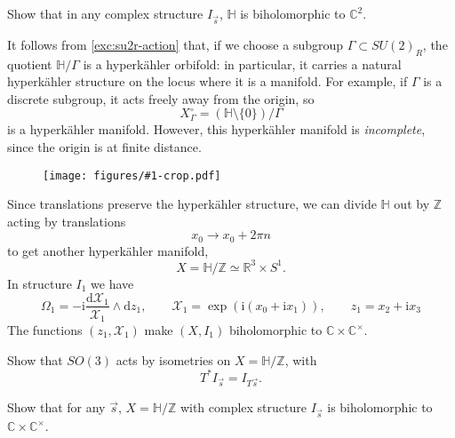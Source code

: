 \documentclass[12pt,letterpaper,reqno]{article}
\numberwithin{equation}{section}
\newcommand{\cX}{\ensuremath{\mathcal X}}
\newcommand{\R}{\ensuremath{\mathbb R}}
\newcommand{\C}{\ensuremath{\mathbb C}}
\newcommand{\Z}{\ensuremath{\mathbb Z}}
\newcommand{\bbH}{\ensuremath{\mathbb H}}
\newcommand{\hk}{hyperk\"ahler\xspace}
\newcommand{\I}{{\mathrm i}}
\newcommand{\de}{\mathrm{d}}
\newcommand{\ti}[1]{\textit{#1}}
\newcommand{\insfig}[2]{\begin{figure}[htbp] \centering \texttt{[image: figures/\#1-crop.pdf]} \label{fig:#1} \end{figure}}
\begin{document}
\begin{exercise}
Show that in any complex structure
$I_{\vec s}$, $\bbH$ is biholomorphic
to $\C^2$.
\end{exercise}

\begin{example}[Quotients of $\bbH$] \label{exa:H-quotients}
It follows from \autoref{exc:su2r-action} that, if we choose a subgroup
$\Gamma \subset SU(2)_R$, the quotient
$\bbH / \Gamma$ is a \hk orbifold: in particular, it
carries a natural \hk structure 
on the locus where it is a manifold. For example,
if $\Gamma$ is a discrete subgroup, it acts
freely away from the origin, so
\begin{equation}
X_\Gamma^\circ = (\bbH \setminus \{0\}) / \Gamma  
\end{equation}
is a \hk manifold.
However, this \hk manifold is \ti{incomplete},
since the origin is at finite distance.
\end{example}

\insfig{higgs-bundles-4}{0.65}

\begin{example}[$\R^3 \times S^1$] \label{exa:R3S1}
Since translations preserve the \hk structure, we can divide $\bbH$
out by $\Z$ acting by translations 
\begin{equation}
 x_0 \to x_0 + 2 \pi n 
\end{equation}
to get another \hk manifold,
\begin{equation}
 X = \bbH / \Z \simeq \R^3 \times S^1.
\end{equation}
In structure $I_1$ we have
\begin{equation}
  \Omega_1 = -\I \frac{\de \cX_1}{\cX_1} \wedge \de z_1, \qquad \cX_1 = \exp(\I(x_0 + \I x_1)), \qquad z_1 = x_2 + \I x_3 
\end{equation}
The functions $(z_1,\cX_1)$ make $(X,I_1)$ 
biholomorphic to $\C \times \C^\times$.
\end{example}

\begin{exercise}
Show that $SO(3)$ acts by isometries on $X = \bbH / \Z$,
with
\begin{equation}
  T^* I_{\vec s} = I_{T \vec s}.
\end{equation}
\end{exercise}

\begin{exercise}
Show that for any $\vec s$, $X = \bbH / \Z$ with complex structure
$I_{\vec s}$ is biholomorphic to $\C \times \C^\times$.
\end{exercise}
\end{document}
